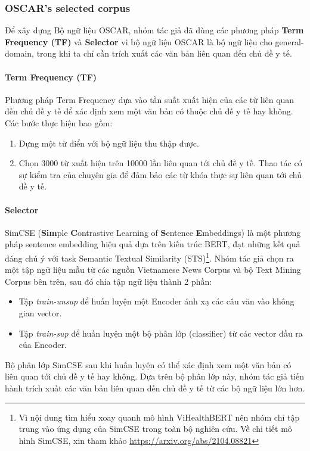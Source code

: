 \subsubsection{OSCAR's selected corpus}
Để xây dựng Bộ ngữ liệu OSCAR\cite{ortiz-suarez-etal-2020-monolingual}, nhóm tác giả đã dùng các phương pháp \textbf{Term Frequency (TF)} và \textbf{Selector} vì bộ ngữ liệu OSCAR là bộ ngữ liệu cho general-domain, trong khi ta chỉ cần trích xuất các văn bản liên quan đến chủ đề y tế.

\paragraph{Term Frequency (TF)}
Phương pháp Term Frequency dựa vào tần suất xuất hiện của các từ liên quan đến chủ đề y tế để xác định xem một văn bản có thuộc chủ đề y tế hay không. Các bước thực hiện bao gồm:
\begin{enumerate}
\item Dựng một từ điển với bộ ngữ liệu thu thập được.
\item Chọn 3000 từ xuất hiện trên 10000 lần liên quan tới chủ đề y tế. Thao tác có sự kiểm tra của chuyên gia để đảm bảo các từ khóa thực sự liên quan tới chủ đề y tế.
\end{enumerate}

\paragraph{Selector}
SimCSE (\textbf{Sim}ple \textbf{C}ontrastive Learning of \textbf{S}entence \textbf{E}mbeddings)\cite{simcse2021} là một phương pháp sentence embedding hiệu quả dựa trên kiến trúc BERT, đạt những kết quả đáng chú ý với task Semantic Textual Similarity (STS)\footnote{Vì nội dung tìm hiểu xoay quanh mô hình ViHealthBERT nên nhóm chỉ tập trung vào ứng dụng của SimCSE trong toàn bộ nghiên cứu. Về chi tiết mô hình SimCSE, xin tham khảo \href{https://arxiv.org/abs/2104.08821}{https://arxiv.org/abs/2104.08821}}. Nhóm tác giả chọn ra một tập ngữ liệu mẫu từ các nguồn Vietnamese News Corpus và bộ Text Mining Corpus bên trên, sau đó chia tập ngữ liệu thành 2 phần: 
\begin{itemize}
\item Tập \textit{train-unsup} để huấn luyện một Encoder ánh xạ các câu văn vào không gian vector.
\item Tập \textit{train-sup} để huấn luyện một bộ phân lớp (classifier) từ các vector đầu ra của Encoder.
\end{itemize}
Bộ phân lớp SimCSE sau khi huấn luyện có thể xác định xem một văn bản có liên quan tới chủ đề y tế hay không. Dựa trên bộ phân lớp này, nhóm tác giả tiến hành trích xuất các văn bản liên quan đến chủ đề y tế từ các bộ ngữ liệu lớn hơn.

